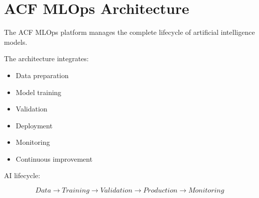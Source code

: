 \section{ACF MLOps Architecture}


The ACF MLOps platform manages the complete lifecycle of
artificial intelligence models.



The architecture integrates:


\begin{itemize}

\item Data preparation

\item Model training

\item Validation

\item Deployment

\item Monitoring

\item Continuous improvement

\end{itemize}



AI lifecycle:


\[
Data
\rightarrow
Training
\rightarrow
Validation
\rightarrow
Production
\rightarrow
Monitoring
\]
